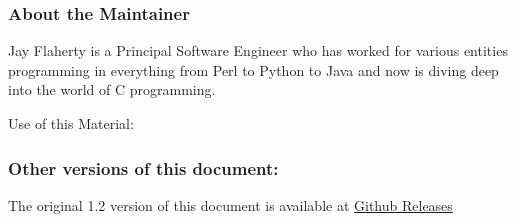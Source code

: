 \hypertarget{about-the-maintainer}{%
\subsubsection{About the Maintainer}\label{about-the-maintainer}}

Jay Flaherty is a Principal Software Engineer who has worked for various
entities programming in everything from Perl to Python to Java and now
is diving deep into the world of C programming.

Use of this Material:

\hypertarget{other-versions-of-this-document}{%
\subsubsection{Other versions of this
document:}\label{other-versions-of-this-document}}

The original 1.2 version of this document is available at
\href{https://github.com/jflaherty/ptrtut13/releases}{Github Releases}

\begin{comment}
\href{introx.htm}{Introduction}

\href{pointers.htm}{Back to Table of Contents}
\end{comment}
